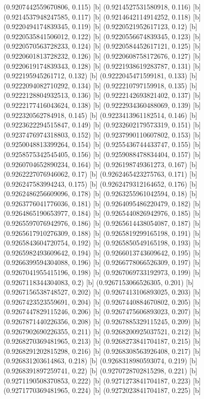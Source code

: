 {{{(0.9207442559670806, 0.115) [b] 
(0.9214527531580918, 0.116) [b] 
(0.9214537948247585, 0.117) [b] 
(0.9214642114914252, 0.118) [b] 
(0.9220494174839345, 0.119) [b] 
(0.9220521952617123, 0.12) [b] 
(0.9220535841506012, 0.122) [b] 
(0.9220556674839345, 0.123) [b] 
(0.9220570563728233, 0.124) [b] 
(0.9220584452617121, 0.125) [b] 
(0.9220601813728232, 0.126) [b] 
(0.9220608758172676, 0.127) [b] 
(0.9220619174839343, 0.128) [b] 
(0.9221938619283787, 0.131) [b] 
(0.922195945261712, 0.132) [b] 
(0.9222045471599181, 0.133) [b] 
(0.9222094082710292, 0.134) [b] 
(0.922210797159918, 0.135) [b] 
(0.9222128804932513, 0.136) [b] 
(0.9222142693821402, 0.137) [b] 
(0.9222177416043624, 0.138) [b] 
(0.9222934360488069, 0.139) [b] 
(0.922320562784918, 0.145) [b] 
(0.9223413961182514, 0.146) [b] 
(0.9223622294515847, 0.149) [b] 
(0.9232602179573319, 0.151) [b] 
(0.9237476974318803, 0.152) [b] 
(0.9237990110607802, 0.153) [b] 
(0.9250048813399264, 0.154) [b] 
(0.9255436744433747, 0.155) [b] 
(0.9258575342545405, 0.156) [b] 
(0.9259088478834404, 0.157) [b] 
(0.9260704652890234, 0.164) [b] 
(0.926198749361273, 0.167) [b] 
(0.9262227076946062, 0.17) [b] 
(0.9262465423275763, 0.171) [b] 
(0.926247583994243, 0.175) [b] 
(0.9262479312164652, 0.176) [b] 
(0.9262486256609096, 0.178) [b] 
(0.9263255961042594, 0.18) [b] 
(0.9263776041776036, 0.181) [b] 
(0.9264095486220479, 0.182) [b] 
(0.9264865190653977, 0.184) [b] 
(0.9265440826942976, 0.185) [b] 
(0.9265597076942976, 0.186) [b] 
(0.9265614438054087, 0.187) [b] 
(0.9265617910276309, 0.188) [b] 
(0.9265819299165198, 0.191) [b] 
(0.9265843604720754, 0.192) [b] 
(0.9265850549165198, 0.193) [b] 
(0.9265982493609642, 0.194) [b] 
(0.9266013743609642, 0.195) [b] 
(0.9266399594304088, 0.196) [b] 
(0.9266778066526309, 0.197) [b] 
(0.9267041955415196, 0.198) [b] 
(0.9267069733192973, 0.199) [b] 
(0.9267118344304083, 0.2) [b] 
(0.9267153066526305, 0.201) [b] 
(0.9267156538748527, 0.202) [b] 
(0.9267413106893025, 0.203) [b] 
(0.9267423523559691, 0.204) [b] 
(0.9267440884670802, 0.205) [b] 
(0.9267447829115246, 0.206) [b] 
(0.9267475606893023, 0.207) [b] 
(0.9267871440226356, 0.208) [b] 
(0.9267885329115245, 0.209) [b] 
(0.9267902690226355, 0.211) [b] 
(0.9268200925037521, 0.212) [b] 
(0.9268270369481965, 0.213) [b] 
(0.9268273841704187, 0.215) [b] 
(0.9268291202815298, 0.216) [b] 
(0.9268308563926408, 0.217) [b] 
(0.926831203614863, 0.218) [b] 
(0.9268318980593074, 0.219) [b] 
(0.9268391897259741, 0.22) [b] 
(0.9270728702815298, 0.221) [b] 
(0.9271190508370853, 0.222) [b] 
(0.9271273841704187, 0.223) [b] 
(0.9271770369481965, 0.224) [b] 
(0.9272023841704187, 0.225) [b] 
}}}
